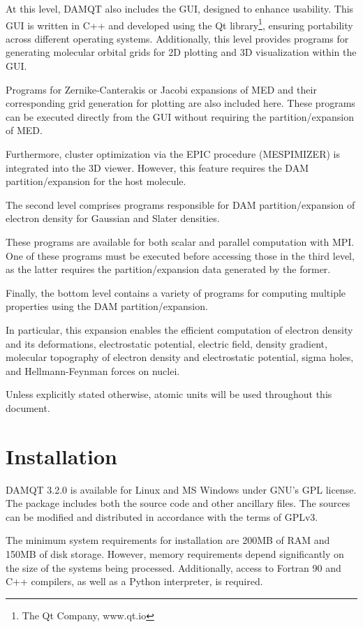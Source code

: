 \documentclass[10pt]{article}
\begin{document}
At this level, DAMQT also includes the GUI, designed to enhance usability.
This GUI is written in C++ and developed using the Qt library\footnote{The Qt Company, www.qt.io}, ensuring portability across different operating systems. Additionally, this level provides programs for generating molecular orbital grids for 2D plotting and 3D visualization within the GUI.

Programs for Zernike-Canterakis or Jacobi expansions of MED and their corresponding grid generation for plotting are also included here.
These programs can be executed directly from the GUI without requiring the partition/expansion of MED.

Furthermore, cluster optimization via the EPIC procedure (MESPIMIZER) is integrated into the 3D viewer. However, this feature requires the DAM partition/expansion for the host molecule. 

The second level comprises programs responsible for DAM partition/expansion of electron density for Gaussian and Slater densities.

These programs are available for both scalar and parallel computation with MPI.
One of these programs must be executed before accessing those in the third level, as the latter requires the partition/expansion data generated by the former. 

Finally, the bottom level contains a variety of programs for computing multiple properties using the DAM partition/expansion. 

In particular, this expansion enables the efficient computation of electron density and its deformations, electrostatic potential, electric field, density gradient,
molecular topography of electron density and electrostatic potential, sigma holes, and Hellmann-Feynman forces on nuclei.

Unless explicitly stated otherwise, atomic units will be used throughout this document.

\newpage

\section{Installation \label{sec:1}}

DAMQT 3.2.0 is available for Linux and MS Windows under GNU's GPL license.
The package includes both the source code and other ancillary files.
The sources can be modified and distributed in accordance with the terms of GPLv3.

The minimum system requirements for installation are 200MB of RAM and 150MB of disk storage.
However, memory requirements depend significantly on the size of the systems being processed.
Additionally, access to Fortran 90 and C++ compilers, as well as a Python interpreter, is required.
\end{document}
